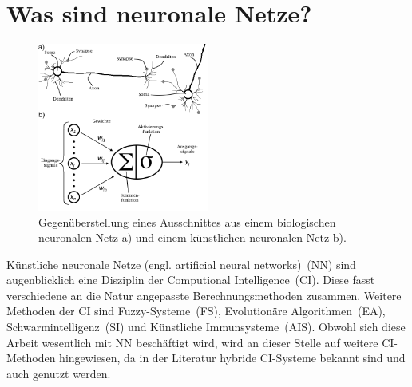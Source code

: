 

\section{Was sind neuronale Netze?}

\begin{figure}
    \centering
        \includegraphics[width=0.5\textwidth]{Bilder/BNN_ANN.png}
    \caption{Gegenüberstellung eines Ausschnittes aus einem biologischen neuronalen Netz a)\protect\footnotemark{} und einem künstlichen neuronalen Netz b).}
    \label{fig:BNN_ANN}
\end{figure}

\addtocounter{footnote}{-1}%
\addtocounter{Hfootnote}{-1}%
\wrapfigfoot{}

Künstliche neuronale Netze (engl. artificial neural networks)~(NN) sind augenblicklich eine Disziplin der Computional Intelligence~(CI). Diese fasst verschiedene an die Natur angepasste Berechnungsmethoden zusammen. Weitere Methoden der CI sind Fuzzy-Systeme~(FS), Evolutionäre Algorithmen~(EA), Schwarmintelligenz~(SI) und Künstliche Immunsysteme~(AIS). Obwohl sich diese Arbeit wesentlich mit NN beschäftigt wird, wird an dieser Stelle auf weitere CI-Methoden hingewiesen, da in der Literatur hybride CI-Systeme bekannt sind und auch genutzt werden.

